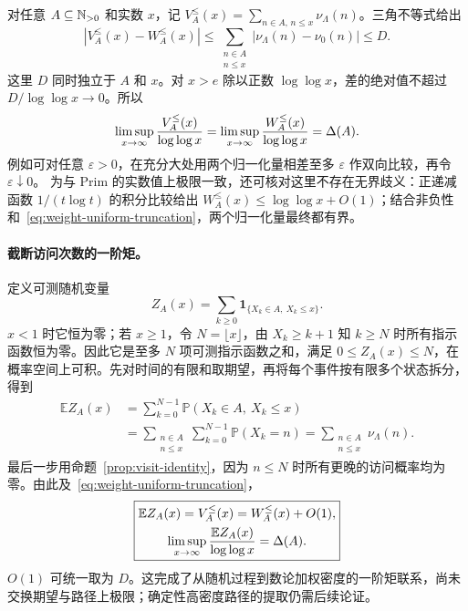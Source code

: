 对任意 $A\subseteq\mathbb N_{>0}$ 和实数 $x$，记
$V_A^{\le}(x)=\sum_{n\in A,\,n\le x}\nu_\Lambda(n)$。三角不等式给出
\begin{equation}\label{eq:weight-uniform-truncation}
 \left|V_A^{\le}(x)-W_A^{\le}(x)\right|
 \le\sum_{\substack{n\in A\\n\le x}}|\nu_\Lambda(n)-\nu_0(n)|\le D.
\end{equation}
这里 $D$ 同时独立于 $A$ 和 $x$。对 $x>e$ 除以正数 $\log\log x$，差的绝对值不超过 $D/\log\log x\to0$。所以
\begin{equation}\label{eq:mangoldt-density-equality}
 \limsup_{x\to\infty}\frac{V_A^{\le}(x)}{\log\log x}
 =\limsup_{x\to\infty}\frac{W_A^{\le}(x)}{\log\log x}=\Delta(A).
\end{equation}
例如可对任意 $\varepsilon>0$，在充分大处用两个归一化量相差至多 $\varepsilon$ 作双向比较，再令 $\varepsilon\downarrow0$。
为与 Prim 的实数值上极限一致，还可核对这里不存在无界歧义：正递减函数 $1/(t\log t)$ 的积分比较给出
$W_A^{\le}(x)\le\log\log x+O(1)$；结合非负性和~\eqref{eq:weight-uniform-truncation}，两个归一化量最终都有界。

\paragraph{截断访问次数的一阶矩。}
定义可测随机变量
\[
 Z_A(x)=\sum_{k\ge0}\mathbf1_{\{X_k\in A,\ X_k\le x\}}.
\]
$x<1$ 时它恒为零；若 $x\ge1$，令 $N=\lfloor x\rfloor$，由 $X_k\ge k+1$ 知 $k\ge N$ 时所有指示函数恒为零。因此它是至多 $N$ 项可测指示函数之和，满足 $0\le Z_A(x)\le N$，在概率空间上可积。先对时间的有限和取期望，再将每个事件按有限多个状态拆分，得到
\begin{align*}
 \mathbb E Z_A(x)
 &=\sum_{k=0}^{N-1}\mathbb P(X_k\in A,\ X_k\le x)\\
 &=\sum_{\substack{n\in A\\n\le x}}\sum_{k=0}^{N-1}\mathbb P(X_k=n)
 =\sum_{\substack{n\in A\\n\le x}}\nu_\Lambda(n).
\end{align*}
最后一步用命题~\ref{prop:visit-identity}，因为 $n\le N$ 时所有更晚的访问概率均为零。由此及~\eqref{eq:weight-uniform-truncation}，
\begin{equation}\label{eq:first-moment-weight}
 \boxed{\begin{gathered}
 \mathbb E Z_A(x)=V_A^{\le}(x)=W_A^{\le}(x)+O(1),\\
 \limsup_{x\to\infty}\frac{\mathbb E Z_A(x)}{\log\log x}=\Delta(A).
 \end{gathered}}
\end{equation}
$O(1)$ 可统一取为 $D$。这完成了从随机过程到数论加权密度的一阶矩联系，尚未交换期望与路径上极限；确定性高密度路径的提取仍需后续论证。

